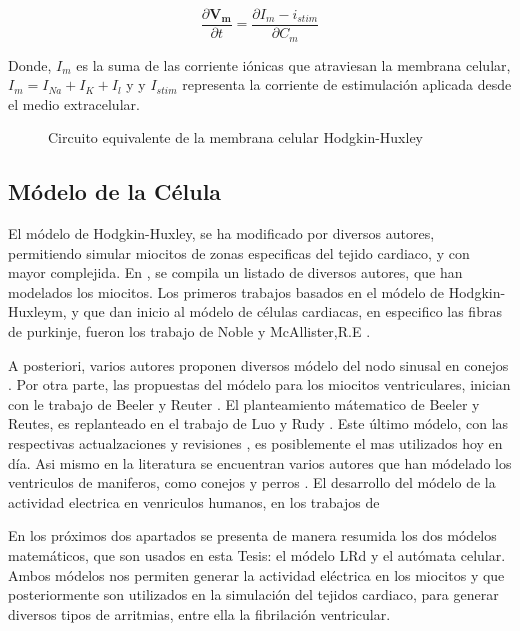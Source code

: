 \begin{equation}\label{eq:N-N}
\frac{\partial{\mathbf{V_m}}}{\partial{t}}=
\frac{\partial{I_{m} - i_{stim}}}{\partial{C_m}}
\end{equation}

Donde, $I_m$ es la suma de las corriente iónicas que  atraviesan la
membrana celular,$I_m = I_{Na} + I_K + I_l$ y y $I_{stim}$ representa la
corriente de estimulación aplicada desde el medio extracelular.


\begin{figure}[t]
\centering
\caption{Circuito equivalente de la membrana celular Hodgkin-Huxley }
  \label{fig:circuitomembrana}
\end{figure}



\subsection{Módelo de la Célula}

El módelo de Hodgkin-Huxley, se ha modificado por diversos
autores, permitiendo simular miocitos de zonas especificas del tejido cardiaco,
y con mayor complejida. En \cite{Sachse04}, se compila un listado de diversos
autores, que han modelados los miocitos. Los primeros trabajos basados en
el módelo de Hodgkin-Huxleym, y que dan inicio al módelo de células
cardiacas, en especifico las fibras de purkinje, fueron los trabajo de Noble
\cite{noble1962} y McAllister,R.E \cite{mcallister1975}.

A posteriori, varios autores proponen diversos módelo del nodo sinusal en
conejos \cite{noble1984, demir1994}. Por otra parte, las propuestas del módelo
para los miocitos ventriculares, inician con le trabajo de Beeler y Reuter
\cite{beeler1977}. El planteamiento mátematico de Beeler y Reutes, es
replanteado en el trabajo de Luo y Rudy \cite{luo1991}. Este último módelo, con
las respectivas actualzaciones  y revisiones \cite{luo1994, livshitz2007}, es
posiblemente el mas utilizados hoy en día.
Asi mismo en la literatura se encuentran varios autores que han módelado los
ventriculos de maniferos, como conejos y perros \cite{courtemanche1998,
demir1996, lindblad1996, noble1998}.  El desarrollo del módelo de la actividad
electrica en venriculos humanos, en los  trabajos de
\cite{nygren1998, bernus2002, sachse2003, ten2004}

En los próximos dos apartados se presenta de manera resumida los
dos módelos matemáticos, que son usados en esta Tesis: el módelo \acf{LRd} y el
autómata celular. Ambos módelos nos permiten generar la actividad
eléctrica en los miocitos y que posteriormente  son utilizados en la  simulación
del tejidos cardiaco, para generar diversos tipos de arritmias, entre ella la
fibrilación ventricular.




